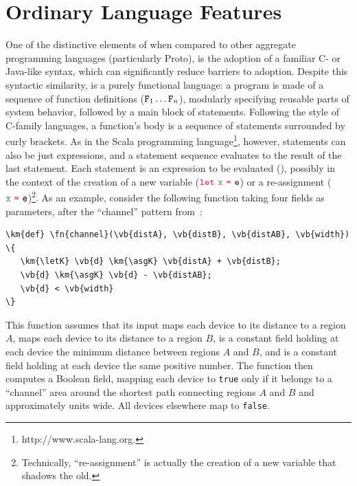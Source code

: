 \documentclass[12pt,a4paper,twoside,openright]{book}
\begin{document}
\section{Ordinary Language Features}

One of the distinctive elements of \protelis{} when compared to other aggregate programming languages (particularly Proto), is the adoption of a familiar C- or Java-like syntax, which can significantly reduce barriers to adoption.
%
Despite this syntactic similarity, \protelis{} is a purely functional language: a program is made of a sequence of function definitions ($\texttt{F}_1\ldots\texttt{F}_n$), modularly specifying reusable parts of system behavior, followed by a main block of statements.
%
Following the style of C-family languages, a function's body is a sequence of statements surrounded by curly brackets.  As in the Scala programming language\footnote{http://www.scala-lang.org.}, however, statements can also be just expressions, and a statement sequence evaluates to the result of the last statement.
%
Each statement is an expression to be evaluated (\e), possibly in the context of the creation of a new variable ($\km{\letK} \vb{\var} \km{\asgK} \e$) or a re-assignment ($\vb{\var} \km{\asgK} \e$)\footnote{Technically, ``re-assignment'' is actually the creation of a new variable that shadows the old.}.
%
As an example, consider the following function taking four fields as parameters, after the ``channel'' pattern from~\cite{butera}:
\begin{center}
\begin{Verbatim}[samepage=true, frame=single, commandchars=\\\{\}]
\km{def} \fn{channel}(\vb{distA}, \vb{distB}, \vb{distAB}, \vb{width}) \{
   \km{\letK} \vb{d} \km{\asgK} \vb{distA} + \vb{distB};
   \vb{d} \km{\asgK} \vb{d} - \vb{distAB};
   \vb{d} < \vb{width}
\}
\end{Verbatim}
\end{center}
This function assumes that its input \texttt{} maps each device to its distance to a region $A$, \texttt{} maps each device to its distance to a region $B$, \texttt{} is a constant field holding at each device the minimum distance between regions $A$ and $B$, and \texttt{} is a constant field holding at each device the same positive number.
%
The function then computes a Boolean field, mapping each device to \texttt{true} only if it belongs to a ``channel'' area around the shortest path connecting regions $A$ and $B$ and approximately \texttt{} units wide.
%
All devices elsewhere map to \texttt{false}.
\end{document}
